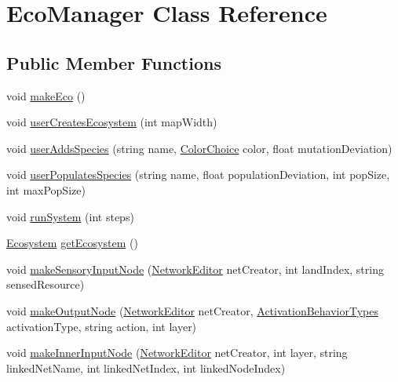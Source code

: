 \hypertarget{class_eco_manager}{}\section{Eco\+Manager Class Reference}
\label{class_eco_manager}
\subsection*{Public Member Functions}
\begin{DoxyCompactItemize}
\item 
void \mbox{\hyperlink{class_eco_manager_ab7ee9ad1b41a4dbb9c8cb5f4c001e469}{make\+Eco}} ()
\item 
void \mbox{\hyperlink{class_eco_manager_a14997719023cc4431bf3b8ee2339163d}{user\+Creates\+Ecosystem}} (int map\+Width)
\item 
void \mbox{\hyperlink{class_eco_manager_ae6ddbd7e4c1fe49dafdf9cf72e121563}{user\+Adds\+Species}} (string name, \mbox{\hyperlink{_creature_editor_8cs_a2d31a955c823bd51aec8f913e263723c}{Color\+Choice}} color, float mutation\+Deviation)
\item 
void \mbox{\hyperlink{class_eco_manager_afff509be31e995fff88fd410bb96899f}{user\+Populates\+Species}} (string name, float population\+Deviation, int pop\+Size, int max\+Pop\+Size)
\item 
void \mbox{\hyperlink{class_eco_manager_a83ca906cad37e9a2c6e41bc58e638e2e}{run\+System}} (int steps)
\item 
\mbox{\hyperlink{class_ecosystem}{Ecosystem}} \mbox{\hyperlink{class_eco_manager_ac4afac929280d605388d110a4a0a2840}{get\+Ecosystem}} ()
\item 
void \mbox{\hyperlink{class_eco_manager_a7f08416b1570f58d235093da6d2c2129}{make\+Sensory\+Input\+Node}} (\mbox{\hyperlink{class_network_editor}{Network\+Editor}} net\+Creator, int land\+Index, string sensed\+Resource)
\item 
void \mbox{\hyperlink{class_eco_manager_a4d84a2362550dc39724e36df7d30ad06}{make\+Output\+Node}} (\mbox{\hyperlink{class_network_editor}{Network\+Editor}} net\+Creator, \mbox{\hyperlink{_non_input_node_8cs_a832a6943e91e304dea9608c4ae2818e7}{Activation\+Behavior\+Types}} activation\+Type, string action, int layer)
\item 
void \mbox{\hyperlink{class_eco_manager_a01ca1dd0c8bb417a67cbb83fe84b894d}{make\+Inner\+Input\+Node}} (\mbox{\hyperlink{class_network_editor}{Network\+Editor}} net\+Creator, int layer, string linked\+Net\+Name, int linked\+Net\+Index, int linked\+Node\+Index)
\end{DoxyCompactItemize}


